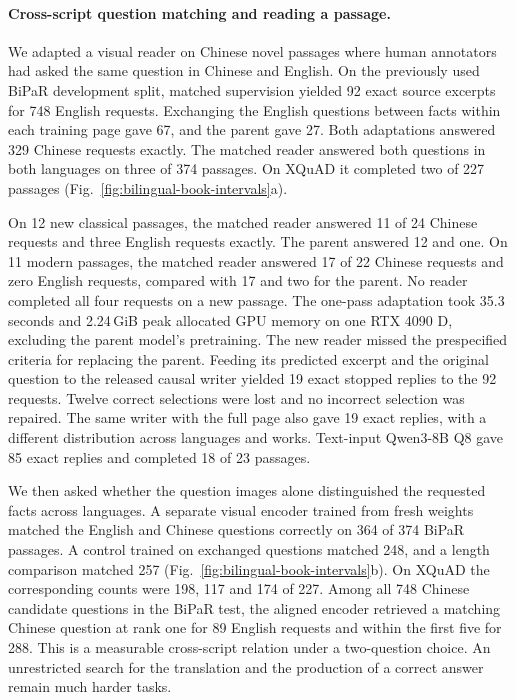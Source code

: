 \paragraph{Cross-script question matching and reading a passage.}
We adapted a visual reader on Chinese novel passages where human annotators had asked the same question in Chinese and English. On the previously used BiPaR development split, matched supervision yielded 92 exact source excerpts for 748 English requests. Exchanging the English questions between facts within each training page gave 67, and the parent gave 27. Both adaptations answered 329 Chinese requests exactly. The matched reader answered both questions in both languages on three of 374 passages. On XQuAD it completed two of 227 passages (Fig.~\ref{fig:bilingual-book-intervals}a).

On 12 new classical passages, the matched reader answered 11 of 24 Chinese requests and three English requests exactly. The parent answered 12 and one. On 11 modern passages, the matched reader answered 17 of 22 Chinese requests and zero English requests, compared with 17 and two for the parent. No reader completed all four requests on a new passage. The one-pass adaptation took 35.3 seconds and 2.24\,GiB peak allocated GPU memory on one RTX 4090 D, excluding the parent model's pretraining. The new reader missed the prespecified criteria for replacing the parent. Feeding its predicted excerpt and the original question to the released causal writer yielded 19 exact stopped replies to the 92 requests. Twelve correct selections were lost and no incorrect selection was repaired. The same writer with the full page also gave 19 exact replies, with a different distribution across languages and works. Text-input Qwen3-8B Q8 gave 85 exact replies and completed 18 of 23 passages.

We then asked whether the question images alone distinguished the requested facts across languages. A separate visual encoder trained from fresh weights matched the English and Chinese questions correctly on 364 of 374 BiPaR passages. A control trained on exchanged questions matched 248, and a length comparison matched 257 (Fig.~\ref{fig:bilingual-book-intervals}b). On XQuAD the corresponding counts were 198, 117 and 174 of 227. Among all 748 Chinese candidate questions in the BiPaR test, the aligned encoder retrieved a matching Chinese question at rank one for 89 English requests and within the first five for 288. This is a measurable cross-script relation under a two-question choice. An unrestricted search for the translation and the production of a correct answer remain much harder tasks.
